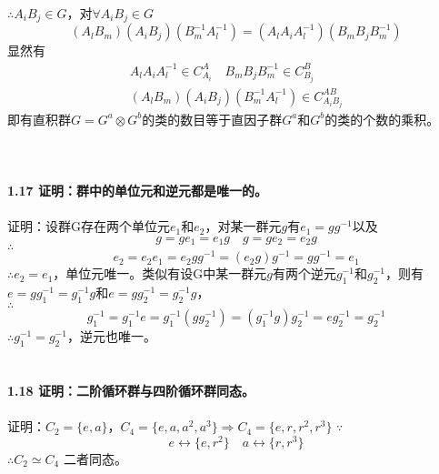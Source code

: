 \documentclass[12pt]{article}
\numberwithin{equation}{section}	 %
\begin{document}
\begin{spacing}{1.5}
$\therefore A_{i}B_{j} \in G$，对$\forall A_{i}B_{j} \in G$
\begin{equation}
(A_{l}B_{m})(A_{i}B_{j})(B_{m}^{-1}A_{l}^{-1}) = (A_{l}A_{i}A_{l}^{-1})(B_{m}B_{j}B_{m}^{-1})
\end{equation}
显然有
\begin{align*}
A_{l}A_{i}A_{l}^{-1} \in C^{A}_{A_{i}} \quad B_{m}B_{j}B_{m}^{-1} \in C^{B}_{B_{j}} \\
(A_{l}B_{m})(A_{i}B_{j})(B_{m}^{-1}A_{l}^{-1}) \in C^{AB}_{A_{i}B_{j}}
\end{align*}
即有直积群$G=G^{a} \otimes G^{b}$的类的数目等于直因子群$G^{a}$和$G^{b}$的类的个数的乘积。\\
~\\
~\\
~\\
\textbf{1.17 \quad 证明：群中的单位元和逆元都是唯一的。}\\
~\\
证明：设群G存在两个单位元$e_{1}$和$e_{2}$，对某一群元$g$有$e_{1}=gg^{-1}$以及
\begin{equation}\nonumber 		%
g=ge_{1}=e_{1}g \quad g=ge_{2}=e_{2}g
\end{equation}
$\therefore$
\begin{equation}
e_{2}=e_{2}e_{1}=e_{2}gg^{-1}=(e_{2}g)g^{-1}=gg^{-1}=e_{1}
\end{equation}
$\therefore e_{2}=e_{1}$，单位元唯一。类似有设G中某一群元$g$有两个逆元$g_{1}^{-1}$和$g_{2}^{-1}$，则有$e=gg_{1}^{-1}=g_{1}^{-1}g$和$e=gg_{2}^{-1}=g_{2}^{-1}g$，\\
$\therefore$
\begin{equation}
g_{1}^{-1} = g_{1}^{-1}e = g_{1}^{-1}(gg_{2}^{-1}) = (g_{1}^{-1}g)g_{2}^{-1} = eg_{2}^{-1} = g_{2}^{-1}
\end{equation}
$\therefore g_{1}^{-1}=g_{2}^{-1}$，逆元也唯一。
~\\
~\\
~\\
\textbf{1.18 \quad 证明：二阶循环群与四阶循环群同态。}\\
~\\
证明：$C_{2} = \{e,a\}$，$C_{4} = \{e,a,a^{2},a^{3}\} \Rightarrow C_{4} = \{e,r,r^{2},r^{3}\}$
$\because$
\begin{equation}
e \leftrightarrow \{e,r^{2}\} \quad a \leftrightarrow \{r,r^{3}\}
\end{equation}
$\therefore C_{2} \simeq C_{4}$ 二者同态。\\
~\\

\end{spacing}
\end{document}
